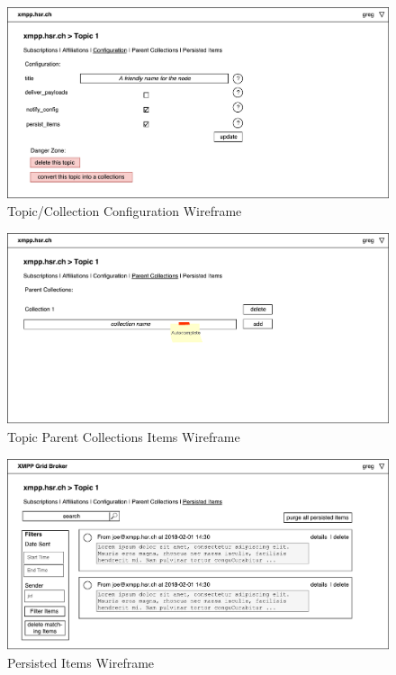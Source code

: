\begin{figure}[h]
    \centering
    \includegraphics[width=1\linewidth]{resources/wireframe_10}
    \caption{Topic/Collection Configuration Wireframe}
\end{figure}

\begin{figure}[h]
    \centering
    \includegraphics[width=1\linewidth]{resources/wireframe_11}
    \caption{Topic Parent Collections Items Wireframe}
\end{figure}

\begin{figure}[h]
    \centering
    \includegraphics[width=1\linewidth]{resources/wireframe_12}
    \caption{Persisted Items Wireframe}
\end{figure}